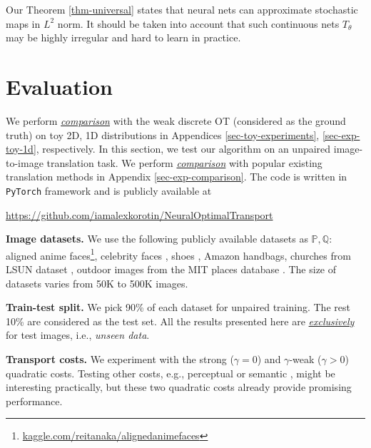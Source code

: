 \documentclass{article} %
\begin{document}
\vspace{-2mm}
Our Theorem \ref{thm-universal} states that neural nets can approximate stochastic maps in $L^{2}$ norm. It should be taken into account that such continuous nets $T_{\theta}$ may be highly irregular and hard to learn in practice. 

\vspace{-2.5mm}
\section{Evaluation}
\label{sec-evaluation}

\vspace{-2mm}We perform \underline{\textit{comparison}} with the weak discrete OT (considered as the ground truth) on toy 2D, 1D distributions in Appendices \ref{sec-toy-experiments}, \ref{sec-exp-toy-1d}, respectively. In this section, we test our algorithm on an unpaired image-to-image translation task. We perform \underline{\textit{comparison}} with popular existing translation methods in Appendix \ref{sec-exp-comparison}. The code is written in \texttt{PyTorch} framework and is publicly available at\vspace{-1.5mm}
\begin{center}
\url{https://github.com/iamalexkorotin/NeuralOptimalTransport}
\end{center}

\vspace{-2mm}\textbf{Image datasets.} We use the following publicly available datasets as $\mathbb{P},\mathbb{Q}$: aligned anime faces\footnote{\url{kaggle.com/reitanaka/alignedanimefaces}}, celebrity faces \citep{liu2015faceattributes}, shoes \citep{yu2014fine}, Amazon handbags, churches from LSUN dataset \citep{yu2015lsun}, outdoor images from the MIT places database \citep{zhou2014learning}. The size of datasets varies from 50K to 500K images.

\vspace{-0.5mm}\textbf{Train-test split.} We pick 90\% of each dataset for unpaired training. The rest 10\% are considered as the test set. All the results presented here are \underline{\textit{exclusively}} for test images, i.e., \textit{unseen data}.

\vspace{-0.5mm}\textbf{Transport costs.} We experiment with the strong ($\gamma=0$) and $\gamma$-weak ($\gamma>0$) quadratic costs. Testing other costs, e.g., perceptual \citep{johnson2016perceptual} or semantic \citep{cherian2019sem}, might be interesting practically, but these two quadratic costs already provide promising performance.
\end{document}
